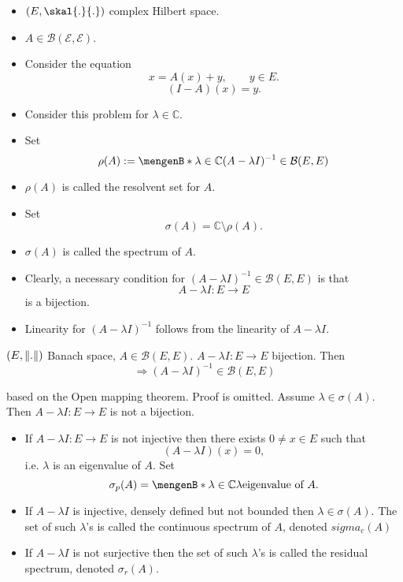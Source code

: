 \begin{itemize}
	\item $(E,\skal{.}{.})$ complex Hilbert space.
	\item $A \in \mathcal{B(E,E)}$. 
	\item Consider the equation
\[
	x = A(x)+ y, \qquad y \in E.
\]
\[
	(I-A)(x)= y.
\]
\item Consider this problem for $\lambda \in \mathbb{C}$. \\
\item Set \[
	\rho(A) := \set[\lambda \in \mathbb{C}]{(A- \lambda I)^{-1} \in \mathcal{B}(E,E)}
\]
\item $\rho(A)$ is called the resolvent set for $A$.
\item Set \[
	\sigma(A) = \mathbb{C} \setminus \rho(A).
\]
\item $\sigma(A)$ is called the spectrum of $A$.
\item Clearly, a necessary condition for $(A-\lambda I)^{-1} \in \mathcal{B}(E,E)$ is that 
\[
	A - \lambda I:E \to E
\]
is a bijection.
\item Linearity for $(A-\lambda I)^{-1}$ follows from the linearity of $A-\lambda I$.

\end{itemize}
\begin{theorem}
	$(E,\norm{.})$ Banach space, $A \in \mathcal{B}(E,E)$. $A-\lambda I: E \to E$ bijection. Then
	\[
		\Rightarrow (A- \lambda I)^{-1} \in \mathcal{B}(E,E)
	\]
\end{theorem}
\begin{beweis}
	based on the Open mapping theorem. Proof is omitted. Assume $\lambda \in \sigma(A)$. Then $A-\lambda I:E \to E$ is not a bijection.

\begin{itemize}
	\item If $A-\lambda I: E \to E$ is not injective then there exists $0 \neq x \in  E $ such that
	\[
		(A- \lambda I)(x) = 0,
	\]
	i.e. $\lambda$ is an eigenvalue of $A$.
	Set	
	\[
		\sigma_p(A) = \set[\lambda \in \mathbb{C}]{\lambda \text{eigenvalue of $A$}}.
	\]
	\item If $A-\lambda I$ is injective, densely defined but not bounded then $\lambda \in \sigma(A)$. The set of such $\lambda$'s is called the continuous spectrum of $A$, denoted $sigma_c(A)$
	\item If $A-\lambda I$ is not surjective then the set of such $\lambda$'s is called the residual spectrum, denoted $\sigma_r(A)$.
\end{itemize}
\end{beweis}
